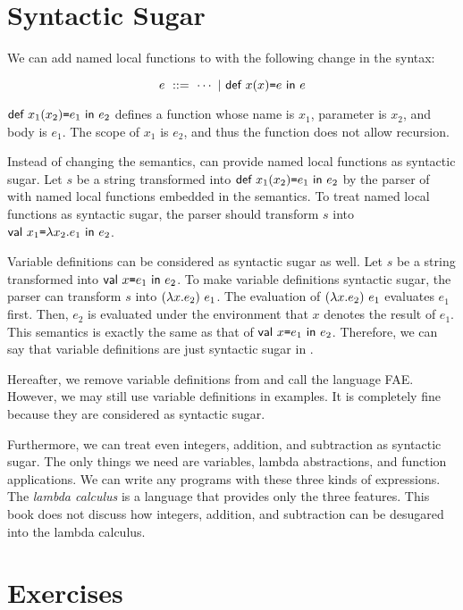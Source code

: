 \section{Syntactic Sugar}

We can add named local functions to \Lang with the following change in the
syntax:

\[
  e\ ::=\ \cdots\ |\ \erec{x}{x}{e}{e}
\]

$\textsf{def}\ x_1(x_2)\texttt{=} e_1\ \textsf{in}\ e_2$ defines a function whose name is $x_1$, parameter is
$x_2$, and body is $e_1$. The scope of $x_1$ is $e_2$, and thus the function
does not allow recursion.

Instead of changing the semantics, \Lang can provide named local functions as
syntactic sugar. Let $s$ be a string transformed into $\textsf{def}\ x_1(x_2)\texttt{=} e_1\ \textsf{in}\ e_2$
by the parser of \Lang with named local functions embedded in the semantics.
To treat named local functions as syntactic sugar, the parser should transform
$s$ into $\textsf{val}\ x_1\texttt{=}\lambda x_2.e_1\ \textsf{in}\ e_2$.

Variable definitions can be considered as syntactic sugar as well.
Let $s$ be a string transformed into $\textsf{val}\ x\texttt{=} e_1\ \textsf{in}\ e_2$.
To make variable definitions syntactic sugar, the parser can transform $s$ into
$(\lambda x.e_2)\ e_1$. The evaluation of $(\lambda x.e_2)\ e_1$
evaluates $e_1$ first. Then, $e_2$ is evaluated under the environment that $x$ denotes
the result of $e_1$. This semantics is exactly the same as that of
$\textsf{val}\ x\texttt{=} e_1\ \textsf{in}\ e_2$. Therefore, we can say that variable definitions are just
syntactic sugar in \Lang.

Hereafter, we remove variable definitions from \Lang and call the language
\textsf{FAE}. However, we may still use variable definitions in examples. It is
completely fine because they are considered as syntactic sugar.

Furthermore, we can treat even integers, addition, and subtraction as syntactic
sugar. The only things we need are variables, lambda abstractions, and function
applications. We can write any programs with these three kinds of expressions.
The \textit{lambda calculus} is a language that provides
only the three features. This book does not discuss how integers, addition, and
subtraction can be desugared into the lambda calculus.

\section{Exercises}

